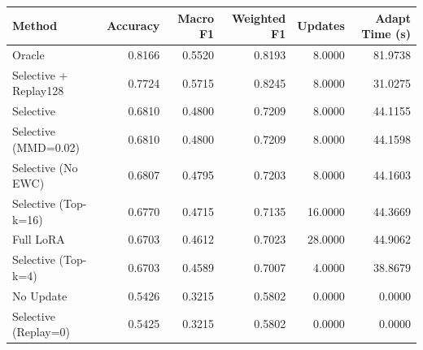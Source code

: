 \begin{tabular}{lrrrrr}
\toprule
Method & Accuracy & Macro F1 & Weighted F1 & Updates & Adapt Time (s) \\
\midrule
Oracle & 0.8166 & 0.5520 & 0.8193 & 8.0000 & 81.9738 \\
Selective + Replay128 & 0.7724 & 0.5715 & 0.8245 & 8.0000 & 31.0275 \\
Selective & 0.6810 & 0.4800 & 0.7209 & 8.0000 & 44.1155 \\
Selective (MMD=0.02) & 0.6810 & 0.4800 & 0.7209 & 8.0000 & 44.1598 \\
Selective (No EWC) & 0.6807 & 0.4795 & 0.7203 & 8.0000 & 44.1603 \\
Selective (Top-k=16) & 0.6770 & 0.4715 & 0.7135 & 16.0000 & 44.3669 \\
Full LoRA & 0.6703 & 0.4612 & 0.7023 & 28.0000 & 44.9062 \\
Selective (Top-k=4) & 0.6703 & 0.4589 & 0.7007 & 4.0000 & 38.8679 \\
No Update & 0.5426 & 0.3215 & 0.5802 & 0.0000 & 0.0000 \\
Selective (Replay=0) & 0.5425 & 0.3215 & 0.5802 & 0.0000 & 0.0000 \\
\bottomrule
\end{tabular}

